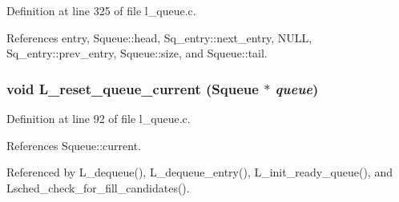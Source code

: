 Definition at line 325 of file l\_\-queue.c.

References entry, Squeue::head, Sq\_\-entry::next\_\-entry, NULL, Sq\_\-entry::prev\_\-entry, Squeue::size, and Squeue::tail.
\subsubsection{\setlength{\rightskip}{0pt plus 5cm}void L\_\-reset\_\-queue\_\-current (\bf{Squeue} $\ast$ {\em queue})}\label{l__queue_8c_b8eee0f8115f1643c7baa5b3bf5f18eb}




Definition at line 92 of file l\_\-queue.c.

References Squeue::current.

Referenced by L\_\-dequeue(), L\_\-dequeue\_\-entry(), L\_\-init\_\-ready\_\-queue(), and Lsched\_\-check\_\-for\_\-fill\_\-candidates().